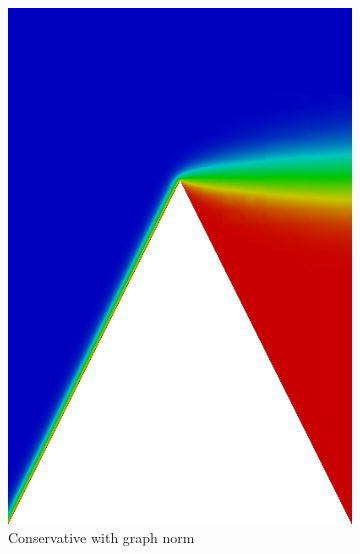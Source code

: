 \documentclass[letterpaper]{article}
\begin{document}
\begin{figure}
\begin{subfigure}[t]{0.4\textwidth}
\includegraphics[width=\textwidth]{figs/Wedge/graph16c.png}
\caption{Conservative with graph norm}
\label{fig:wedgeGraph16c}
\end{subfigure}
\begin{subfigure}[t]{0.4\textwidth}
\centering

\end{subfigure}
\end{figure}
\end{document}
